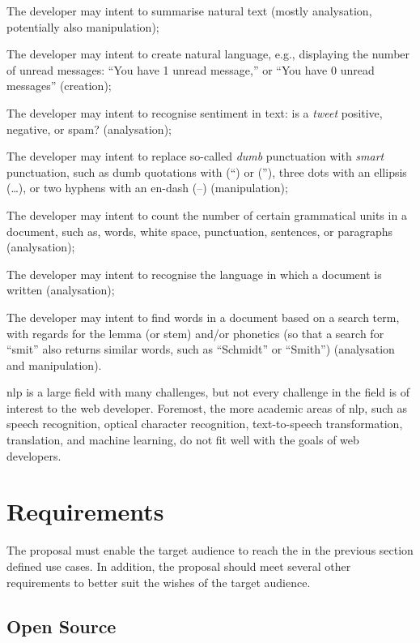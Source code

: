 \begin{aenumerate}
\item The developer may intent to summarise natural text (mostly analysation,
  potentially also manipulation);
\item The developer may intent to create natural language, e.g., displaying
  the number of unread messages: ``You have 1 unread message,'' or ``You
  have 0 unread messages'' (creation);
\item The developer may intent to recognise sentiment in text: is a
  \emph{tweet} positive, negative, or spam? (analysation);
\item The developer may intent to replace so-called \emph{dumb} punctuation
  with \emph{smart} punctuation, such as dumb quotations with (``) or (''),
  three dots with an ellipsis (\ldots{}), or two hyphens with an en-dash
  (--) (manipulation);
\item The developer may intent to count the number of certain grammatical
  units in a document, such as, words, white space, punctuation, sentences,
  or paragraphs (analysation);
\item The developer may intent to recognise the language in which a document
  is written (analysation);
\item The developer may intent to find words in a document based on a search
  term, with regards for the lemma (or stem) and\slash or phonetics (so that
  a search for ``smit'' also returns similar words, such as ``Schmidt'' or
  ``Smith'') (analysation and manipulation).
\end{aenumerate}

\gls{nlp} is a large field with many challenges, but not every challenge in
  the field is of interest to the web developer.
Foremost, the more academic areas of \gls{nlp}, such as speech recognition,
  optical character recognition, text-to-speech transformation, translation,
  and machine learning, do not fit well with the goals of web developers.

\section{Requirements}\label{requirements}

The proposal must enable the target audience to reach the in the previous
  section defined use cases.
In addition, the proposal should meet several other requirements to better
  suit the wishes of the target audience.

\subsection{Open Source}\label{open-source}

